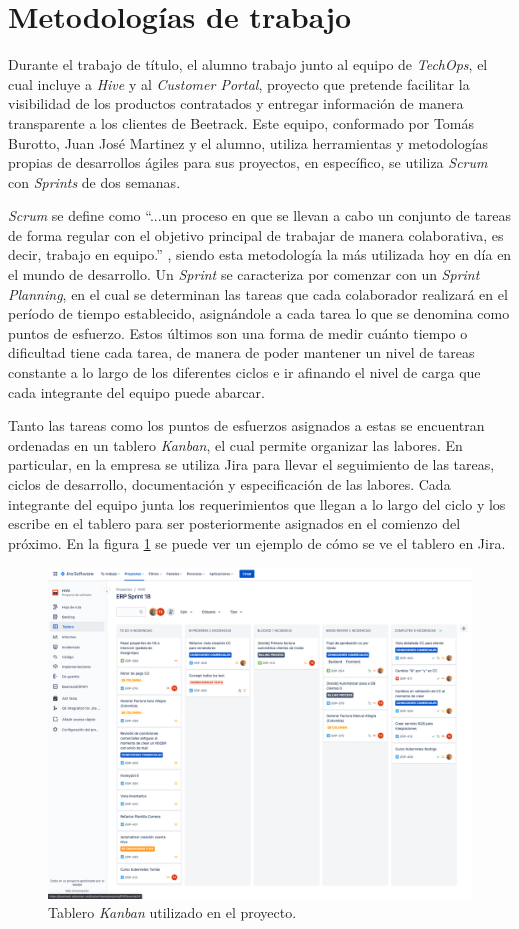 \section{Metodologías de trabajo}

    Durante el trabajo de título, el alumno trabajo junto al equipo de \textit{TechOps}, el cual incluye a \textit{Hive} y al \textit{Customer Portal}, proyecto que pretende facilitar la visibilidad de los productos contratados y entregar información de manera transparente a los clientes de Beetrack. Este equipo, conformado por Tomás Burotto, Juan José Martinez y el alumno, utiliza herramientas y metodologías propias de desarrollos ágiles para sus proyectos, en específico, se utiliza \textit{Scrum} con \textit{Sprints} de dos semanas.
    
    \textit{Scrum} se define como ``...un proceso en que se llevan a cabo un conjunto de tareas de forma regular con el objetivo principal de trabajar de manera colaborativa, es decir, trabajo en equipo.'' \cite{scrum_definition}, siendo esta metodología la más utilizada hoy en día en el mundo de desarrollo. Un \textit{Sprint} se caracteriza por comenzar con un \textit{Sprint Planning}, en el cual se determinan las tareas que cada colaborador realizará en el período de tiempo establecido, asignándole a cada tarea lo que se denomina como puntos de esfuerzo. Estos últimos son una forma de medir cuánto tiempo o dificultad tiene cada tarea, de manera de poder mantener un nivel de tareas constante a lo largo de los diferentes ciclos e ir  afinando el nivel de carga que cada integrante del equipo puede abarcar.
    
    Tanto las tareas como los puntos de esfuerzos asignados a estas se encuentran ordenadas en un tablero \textit{Kanban}, el cual permite organizar las labores. En particular, en la empresa se utiliza Jira para llevar el seguimiento de las tareas, ciclos de desarrollo, documentación y especificación de las labores. Cada integrante del equipo junta los requerimientos que llegan a lo largo del ciclo y los escribe en el tablero para ser posteriormente asignados en el comienzo del próximo. En la figura \ref{fig:kanban} se puede ver un ejemplo de cómo se ve el tablero en Jira.
    
    \begin{figure}
        \centering
        \includegraphics[width=0.75\linewidth]{figures/jira.png}
        \caption{Tablero \textit{Kanban} utilizado en el proyecto.}
        \label{fig:kanban}
    \end{figure}
    
